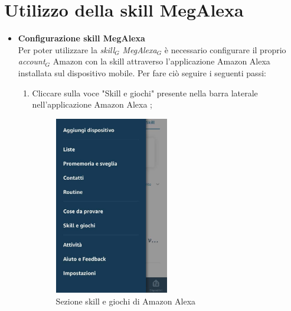 \section{Utilizzo della skill MegAlexa}
\label{Utilizzo skill}
\begin{itemize}
\item  \textbf{Configurazione skill MegAlexa}\\
\label{Configurazione MegAlexa}
Per poter utilizzare la \textit{skill$_{G}$} \textit{MegAlexa$_{G}$} è necessario configurare il proprio \textit{account$_{G}$} Amazon con la skill  attraverso l'applicazione Amazon Alexa installata sul dispositivo mobile. Per fare ciò seguire i seguenti passi:
\begin{enumerate}
	\item  Cliccare sulla voce "Skill e giochi"  presente nella barra laterale nell'applicazione Amazon Alexa ;
	
	\begin{figure}[!ht]
		\centering
		\includegraphics[width=0.5\textwidth]{images/SkillGiochi.png}
		\caption{Sezione skill e giochi di Amazon Alexa}
	\end{figure}
\newpage
	

\end{enumerate}
\end{itemize}
